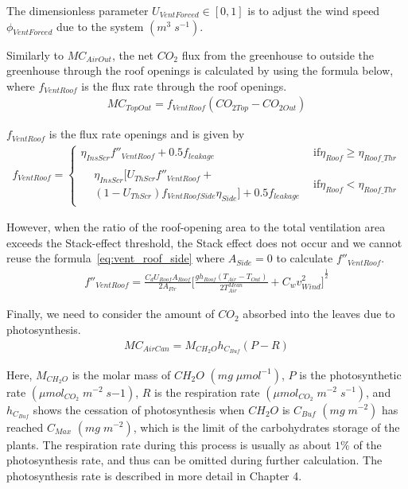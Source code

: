 \documentclass[a4paper]{article}
\begin{document}
The dimensionless parameter \(U_{VentForced} \in [0,1]\) is to adjust the wind speed \(\phi_{VentForced}\) due to
the system \((m^3\;s^{-1})\).

Similarly to \(MC_{AirOut}\), the net \(CO_2\) flux from the greenhouse to outside the greenhouse through the roof openings is calculated by using the formula below, where \(f_{VentRoof}\) is the flux rate through the roof openings.
\begin{gather}
  MC_{TopOut} = f_{VentRoof}(CO_{2 Top} - CO_{2 Out})
\end{gather}

\(f_{VentRoof}\) is the flux rate openings and is given by
\begin{gather}
  f_{VentRoof} =
  \begin{cases}
    \eta_{InsScr} f''_{VentRoof} + 0.5f_{leakage} & \text{if} \eta_{Roof} \geq \eta_{Roof\_Thr} \\
    \begin{split}
      & \eta_{InsScr} [U_{ThScr}f''_{VentRoof} + \\
      & (1-U_{ThScr})f_{VentRoofSide} \eta_{Side}] + 0.5 f_{leakage}
    \end{split}                    & \text{if}  \eta_{Roof} < \eta_{Roof\_Thr}
  \end{cases}
\end{gather}

However, when the ratio of the roof-opening area to the total ventilation area exceeds the Stack-effect threshold, the Stack effect does not occur and we cannot reuse the formula~\ref{eq:vent_roof_side} where \(A_{Side} = 0\) to
calculate \(f''_{VentRoof}\).
\begin{gather}
  f''_{VentRoof} = \frac{C_d U_{Roof} A_{Roof}}{2A_{Flr}} {\Big[\frac{gh_{Roof}(T_{Air} - T_{Out})}{2T^{Mean}_{Air}} + C_w v^2_{Wind} \Big]}^{ \frac{1}{2}}
\end{gather}

Finally, we need to consider the amount of \(CO_2\) absorbed into the leaves due to photosynthesis.
\begin{gather}
  MC_{AirCan} = M_{CH_2O} h_{C_{Buf}} (P - R)
\end{gather}

Here, \(M_{CH_2O}\) is the molar mass of \(CH_2O\) \((mg\;\mu mol^{-1})\), \(P\) is the photosynthetic rate \((\mu mol_{CO_2}\;m^{-2}\;s{-1})\), \(R\) is the respiration rate \((\mu mol_{CO_2}\;m^{-2}\;s^{-1})\), and \(h_{C_{Buf}}\) shows the cessation of photosynthesis when \(CH_2O\) is \(C_{Buf}\) \((mg\;m^{-2})\) has reached \(C_{Max}\) \((mg\;m^{-2})\), which is the limit of the carbohydrates storage of the plants. The respiration rate during this process is usually as about \(1\%\) of the photosynthesis rate, and thus can be omitted during further calculation. The photosynthesis rate is described in more detail in Chapter 4.
\end{document}
